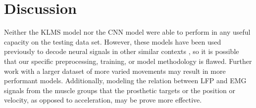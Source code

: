 \documentclass[12pt]{article}
\begin{document}
\section{Discussion}

Neither the KLMS model nor the CNN model were able to perform in any useful capacity on the testing data set. However, these models have been used previously to decode neural signals in other similar contexts \cite{zhengli2014}, so it is possible that our specific preprocessing, training, or model methodology is flawed. Further work with a larger dataset of more varied movements may result in more performant models. Additionally, modeling the relation between LFP and EMG signals from the muscle groups that the prosthetic targets or the position or velocity, as opposed to acceleration, may be prove more effective.



\end{document}
